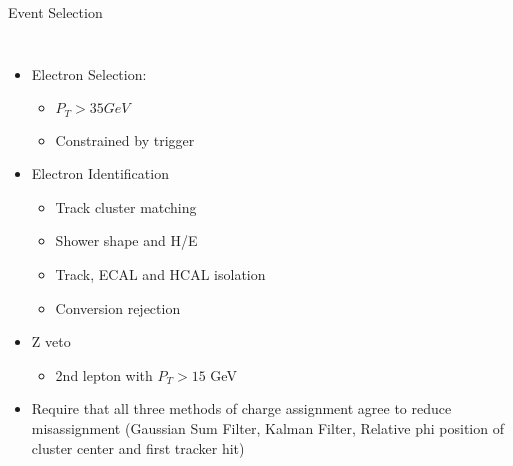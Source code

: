 \documentclass[8pt]{beamer}
\begin{document}
\begin{frame}{Event Selection}
  \begin{columns}[c]
  \begin{itemize}
    \item Electron Selection:
    \begin{itemize}
      \item $P_T > 35 GeV$
      \item Constrained by trigger
    \end{itemize}
    \item Electron Identification
    \begin{itemize}
      \item Track cluster matching
      \item Shower shape and H/E
      \item Track, ECAL and HCAL isolation
      \item Conversion rejection
    \end{itemize}
    \item Z veto
    \begin{itemize}
      \item 2nd lepton with $P_T > 15$ GeV
    \end{itemize}
    \item Require that all three methods of charge assignment agree to reduce
    misassignment (Gaussian Sum Filter, Kalman Filter, Relative phi position of
    cluster center and first tracker hit)
  \end{itemize}


\end{columns}
\end{frame}
\end{document}
